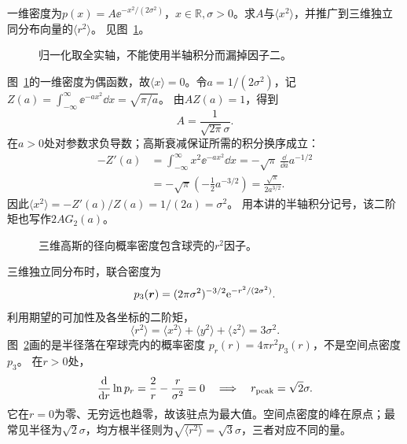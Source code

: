 \begin{exercise}[高斯分布的归一化与二阶矩]\label{ex:c4-h7}
一维密度为$p(x)=A\ee^{-x^2/(2\sigma^2)}$，$x\in\mathbb R,\sigma>0$。求$A$与$\langle x^2\rangle$，并推广到三维独立同分布向量的$\langle r^2\rangle$。 见图~\ref{fig:c4-h7-q}。
\end{exercise}

\begin{figure}[H]\centering
{}
\caption{归一化取全实轴，不能使用半轴积分而漏掉因子二。}\label{fig:c4-h7-q}
\end{figure}
\begin{solution}
图~\ref{fig:c4-h7-q}的一维密度为偶函数，故$\langle x\rangle=0$。令$a=1/(2\sigma^2)$，记
$Z(a)=\int_{-\infty}^{\infty}\ee^{-ax^2}\dd x=\sqrt{\pi/a}$。
由$AZ(a)=1$，得到
\[
 \boxed{A=\frac1{\sqrt{2\pi}\sigma}}.
\]
在$a>0$处对参数求负导数；高斯衰减保证所需的积分换序成立：
\[\begin{aligned}
-Z'(a)&=\int_{-\infty}^{\infty}x^2\ee^{-ax^2}\dd x
=-\sqrt\pi\,\frac{\dd}{\dd a}a^{-1/2}\\
&=-\sqrt\pi\left(-\frac12a^{-3/2}\right)
=\frac{\sqrt\pi}{2a^{3/2}}.
\end{aligned}\]
因此$\boxed{\langle x^2\rangle=-Z'(a)/Z(a)=1/(2a)=\sigma^2}$。
用本讲的半轴积分记号，该二阶矩也写作$2AG_2(a)$。
\begin{figure}[H]\centering
{}
\caption{三维高斯的径向概率密度包含球壳的$r^2$因子。}\label{fig:c4-h7-s}
\end{figure}
三维独立同分布时，联合密度为
\[
 p_3(\bm{r})=(2\pi\sigma^2)^{-3/2}\mathrm e^{-r^2/(2\sigma^2)}.
\]
利用期望的可加性及各坐标的二阶矩，
\[
 \boxed{\langle r^2\rangle
 =\langle x^2\rangle+\langle y^2\rangle+\langle z^2\rangle
 =3\sigma^2}.
\]
图~\ref{fig:c4-h7-s}画的是半径落在窄球壳内的概率密度
$p_r(r)=4\pi r^2p_3(r)$，不是空间点密度$p_3$。
在$r>0$处，
\[
 \frac{\mathop{}\!\mathrm d}{\mathop{}\!\mathrm d r}\ln p_r=\frac2r-\frac r{\sigma^2}=0
 \quad\Longrightarrow\quad r_{\rm peak}=\sqrt2\sigma.
\]
它在$r=0$为零、无穷远也趋零，故该驻点为最大值。空间点密度的峰在原点；最常见半径为$\sqrt2\sigma$，均方根半径则为$\sqrt{\langle r^2\rangle}=\sqrt3\sigma$，三者对应不同的量。
\end{solution}

